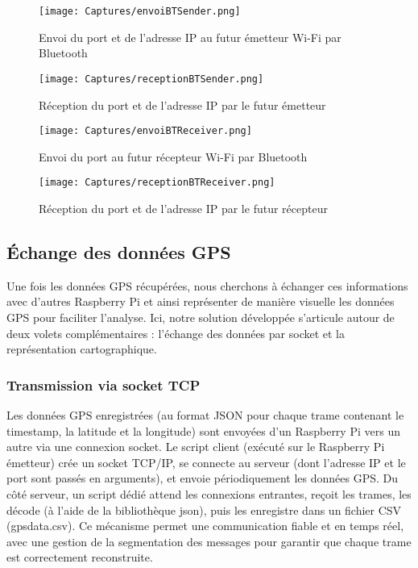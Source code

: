 \documentclass[a4paper,11pt]{article}
\begin{document}
\begin{figure}[H]
    \centering
    \texttt{[image: Captures/envoiBTSender.png]}
    \caption{Envoi du port et de l'adresse IP au futur émetteur Wi-Fi par Bluetooth}
    \label{fig:bt1}
\end{figure}

\begin{figure}[H]
    \centering
    \texttt{[image: Captures/receptionBTSender.png]}
    \caption{Réception du port et de l'adresse IP par le futur émetteur}
    \label{fig:bt2}
\end{figure}

\begin{figure}[H]
    \centering
    \texttt{[image: Captures/envoiBTReceiver.png]}
    \caption{Envoi du port au futur récepteur Wi-Fi par Bluetooth}
    \label{fig:bt3}
\end{figure}

\begin{figure}[H]
    \centering
    \texttt{[image: Captures/receptionBTReceiver.png]}
    \caption{Réception du port et de l'adresse IP par le futur récepteur}
    \label{fig:bt4}
\end{figure}


\subsection{Échange des données GPS}
Une fois les données GPS récupérées, nous cherchons à échanger ces informations avec d'autres Raspberry Pi et ainsi représenter de manière visuelle les données GPS pour faciliter l’analyse. Ici, notre solution développée s’articule autour de deux volets complémentaires : l’échange des données par socket et la représentation cartographique.

\subsubsection{Transmission via socket TCP}
Les données GPS enregistrées (au format JSON pour chaque trame contenant le timestamp, la latitude et la longitude) sont envoyées d’un Raspberry Pi vers un autre via une connexion socket.
Le script client (exécuté sur le Raspberry Pi émetteur) crée un socket TCP/IP, se connecte au serveur (dont l’adresse IP et le port sont passés en arguments), et envoie périodiquement les données GPS.
Du côté serveur, un script dédié attend les connexions entrantes, reçoit les trames, les décode (à l’aide de la bibliothèque json), puis les enregistre dans un fichier CSV (gpsdata.csv). Ce mécanisme permet une communication fiable et en temps réel, avec une gestion de la segmentation des messages pour garantir que chaque trame est correctement reconstruite.
\end{document}
